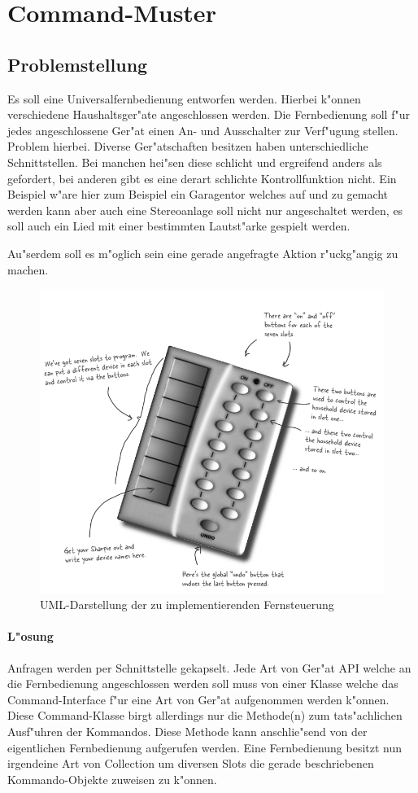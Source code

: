 \section{Command-Muster}

\subsection{Problemstellung}
Es soll eine Universalfernbedienung entworfen werden. Hierbei k"onnen verschiedene Haushaltsger"ate angeschlossen werden. Die Fernbedienung soll f"ur jedes angeschlossene Ger"at einen An- und Ausschalter zur Verf"ugung stellen. Problem hierbei. Diverse Ger"atschaften besitzen haben unterschiedliche Schnittstellen. Bei manchen hei"sen diese schlicht und ergreifend anders als gefordert, bei anderen gibt es eine derart schlichte Kontrollfunktion nicht. Ein Beispiel w"are hier zum Beispiel ein Garagentor welches auf und zu gemacht werden kann aber auch eine Stereoanlage soll nicht nur angeschaltet werden, es soll auch ein Lied mit einer bestimmten Lautst"arke gespielt werden. 

Au"serdem soll es m"oglich sein eine gerade angefragte Aktion r"uckg"angig zu machen. 

\begin{figure}[b!]
	\centering
	\includegraphics[width=.6\linewidth]{command/img/commandPatternRemote}
	\caption{UML-Darstellung der zu implementierenden Fernsteuerung}
	\label{fig:commandRemote}
\end{figure}

\paragraph{L"osung}
Anfragen werden per Schnittstelle gekapselt. Jede Art von Ger"at API welche an die Fernbedienung angeschlossen werden soll muss von einer Klasse welche das Command-Interface f"ur eine Art von Ger"at aufgenommen werden k"onnen. Diese Command-Klasse birgt allerdings nur die Methode(n) zum tats"achlichen Ausf"uhren der Kommandos. Diese Methode kann anschlie"send von der eigentlichen Fernbedienung aufgerufen werden. Eine Fernbedienung besitzt nun irgendeine Art von Collection um diversen Slots die gerade beschriebenen Kommando-Objekte zuweisen zu k"onnen. 

